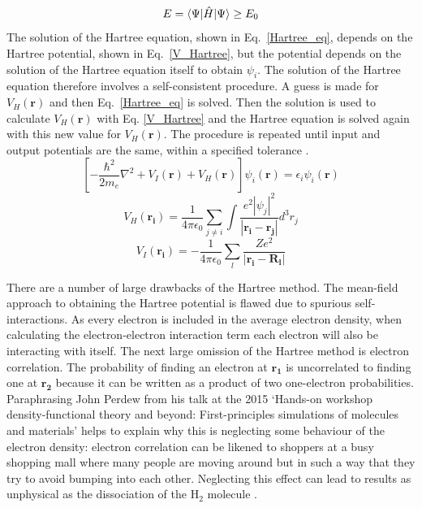 \documentclass[11pt, twoside]{report}
\begin{document}
\begin{equation}\label{var_princip}
E = \braket{\Psi | \hat{H} | \Psi } \geq E_0
\end{equation}
The solution of the Hartree equation, shown in Eq.~\ref{Hartree_eq}, depends on the Hartree potential, shown in Eq.~\ref{V_Hartree}, but the potential depends on the solution of the Hartree equation itself to obtain $\psi_i$. The solution of the Hartree equation therefore involves a self-consistent procedure. A guess is made for $V_H(\mathbf{r})$ and then Eq.~\ref{Hartree_eq} is solved. Then the solution is used to calculate $V_H(\mathbf{r})$ with Eq. \ref{V_Hartree} and the Hartree equation is solved again with this new value for $V_H(\mathbf{r})$. The procedure is repeated until input and output potentials are the same, within a specified tolerance \cite{Prasad_ch2}.
\begin{equation}\label{Hartree_eq}
\left[ -\frac{\hbar^2}{2m_e}\nabla^2 + V_I(\mathbf{r}) + V_H(\mathbf{r}) \right] \psi_i(\mathbf{r}) = \epsilon_i \psi_i(\mathbf{r})
\end{equation}
\begin{equation}\label{V_Hartree}
V_H(\mathbf{r_i}) = \frac{1}{4 \pi \epsilon_0} \sum_{j \neq i} \int \frac{ e^2 |\psi_j|^2}{|\mathbf{r_i} - \mathbf{r_j}|}  d^3r_j
\end{equation}
\begin{equation}\label{V_I}
V_I(\mathbf{r_i}) = -\frac{1}{4 \pi \epsilon_0} \sum_l \frac{Ze^2}{|\mathbf{r_i} - \mathbf{R_l}|}
\end{equation}

There are a number of large drawbacks of the Hartree method. The mean-field approach to obtaining the Hartree potential is flawed due to spurious self-interactions. 
As every electron is included in the average electron density, when calculating the electron-electron interaction term each electron will also be interacting with itself.
The next large omission of the Hartree method is electron correlation. The probability of finding an electron at $\mathbf{r_1}$ is uncorrelated to finding one at $\mathbf{r_2}$ because it can be written as a product of two one-electron probabilities. Paraphrasing John Perdew from his talk at the 2015 `Hands-on workshop density-functional theory and beyond: First-principles simulations of molecules and materials' helps to explain why this is neglecting some behaviour of the electron density: electron correlation can be likened to shoppers at a busy shopping mall where many people are moving around but in such a way that they try to avoid bumping into each other. Neglecting this effect can lead to results as unphysical as the dissociation of the H$_2$ molecule \cite{Prasad_ch2}.
\end{document}
